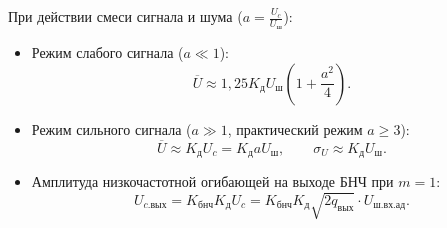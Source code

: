 \documentclass[12pt,a4paper]{article}
\begin{document}
При действии смеси сигнала и шума ($a = \frac{U_c}{U_{\text{ш}}}$):
\begin{itemize}
    \item Режим слабого сигнала ($a \ll 1$):
    \begin{equation}
    \overline{U} \approx 1{,}25 K_{\text{д}} U_{\text{ш}} \left(1 + \frac{a^2}{4}\right).
    \end{equation}
    \item Режим сильного сигнала ($a \gg 1$, практический режим $a \ge 3$):
    \begin{equation}
    \overline{U} \approx K_{\text{д}} U_c = K_{\text{д}} a U_{\text{ш}}, \qquad \sigma_U \approx K_{\text{д}} U_{\text{ш}}.
    \end{equation}
    \item Амплитуда низкочастотной огибающей на выходе БНЧ при $m=1$:
    \begin{equation}
    U_{c.\text{вых}} = K_{\text{бнч}} K_{\text{д}} U_c = K_{\text{бнч}} K_{\text{д}} \sqrt{2 q_{\text{вых}}} \cdot U_{\text{ш.вх.ад}}.
    \end{equation}
\end{itemize}
\end{document}
